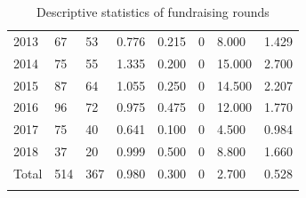\documentclass[12pt]{article}
\begin{document}
\begin{table} [ht]
\begin{tabular}{p{3.2cm} p{1.2cm} p{1.2cm} p{1.2cm} p{1.2cm} p{1.2cm} p{1.2cm} p{1.2cm}}
2013 & 67 & 53 & 0.776 & 0.215 & 0 & 8.000 & 1.429 \\
2014 & 75 & 55 & 1.335 & 0.200 & 0 & 15.000 & 2.700 \\
2015 & 87 & 64 & 1.055 & 0.250 & 0 & 14.500 & 2.207 \\
2016 & 96 & 72 & 0.975 & 0.475 & 0 & 12.000 & 1.770 \\
2017 & 75 & 40 & 0.641 & 0.100 & 0 & 4.500 & 0.984 \\
2018 & 37 & 20 & 0.999 & 0.500 & 0 & 8.800 & 1.660 \\
\cmidrule(l){2-8}
Total & 514 & 367 & 0.980 & 0.300 & 0 & 2.700 & 0.528 \\
 & & \\
\end{tabular}
\caption{Descriptive statistics of fundraising rounds}
\label{table3}
\end{table}
\end{document}
